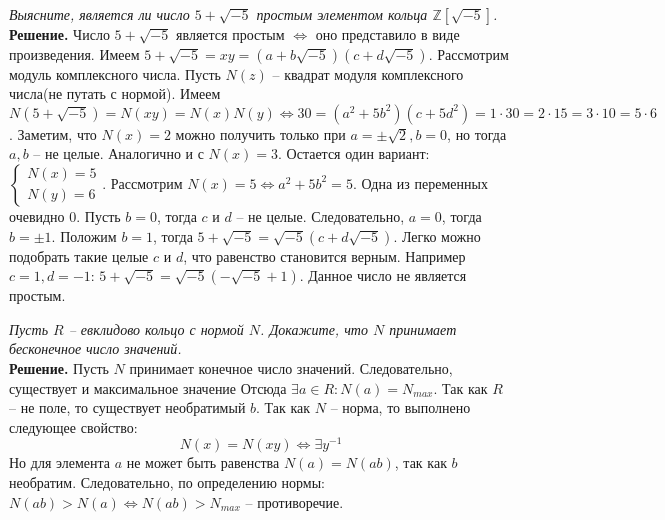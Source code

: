 \documentclass[a4paper, 12pt]{article}
\newcommand{\Z}{\mathbb{Z}}
\newcommand{\N}{\mathbb{N}}
\begin{document}
\begin{spacing}{1}
\begin{center}
\end{center}

\noindent \textit{Выясните, является ли число $5+\sqrt{-5}$ простым элементом кольца $\Z[\sqrt{-5}]$.}\\
\noindent \textbf{Решение.} Число $5+\sqrt{-5}$ является простым $\Leftrightarrow$ оно представило в виде произведения. Имеем $5+\sqrt{-5} = xy =(a + b\sqrt{-5})(c + d\sqrt{-5})$. Рассмотрим модуль комплексного числа. Пусть $N(z)$ -- квадрат модуля комплексного числа(не путать с нормой). Имеем $N(5+\sqrt{-5})= N(xy) = N(x)N(y) \Leftrightarrow30 = (a^2 + 5b^2)(c + 5d^2) = 1 \cdot 30 = 2 \cdot 15 = 3 \cdot 10 = 5\cdot 6$. Заметим, что $N(x) = 2$ можно получить только при $a = \pm\sqrt2, b = 0$, но тогда $a, b$ -- не целые. Аналогично и с $N(x) = 3$. Остается один вариант: $\begin{cases}
N(x) = 5\\N(y) = 6
\end{cases}$. Рассмотрим $N(x) = 5 \Leftrightarrow a^2 + 5b^2 = 5$. Одна из переменных очевидно 0. Пусть $b = 0$, тогда $c$ и $d$ -- не целые. Следовательно, $a = 0$, тогда $b = \pm 1$. Положим $b = 1$, тогда $5+\sqrt{-5} = \sqrt{-5}(c + d\sqrt{-5})$. Легко можно подобрать такие целые $c$ и $d$, что равенство становится верным. Например $c = 1, d = -1$:
$5+\sqrt{-5} = \sqrt{-5}(-\sqrt{-5} + 1)$. Данное число не является простым.
\end{spacing}



\begin{center}
\end{center}

\noindent \textit{Пусть $R$ -- евклидово кольцо с нормой $N$. Докажите, что $N$ принимает бесконечное число значений.}\\
\noindent \textbf{Решение.} Пусть $N$ принимает конечное число значений. Следовательно, существует и максимальное значение Отсюда $\exists a \in R: N(a) = N_{max}$. Так как $R$ -- не поле, то существует необратимый $b$. Так как $N$ -- норма, то выполнено следующее свойство:
$$
N(x) = N(xy) \Leftrightarrow \exists y^{-1}
$$
Но для элемента $a$ не может быть равенства $N(a) = N(ab)$, так как $b$ необратим. Следовательно, по определению нормы: $N(ab) > N(a) \Leftrightarrow N(ab) > N_{max}$ -- противоречие. 
\end{document}
